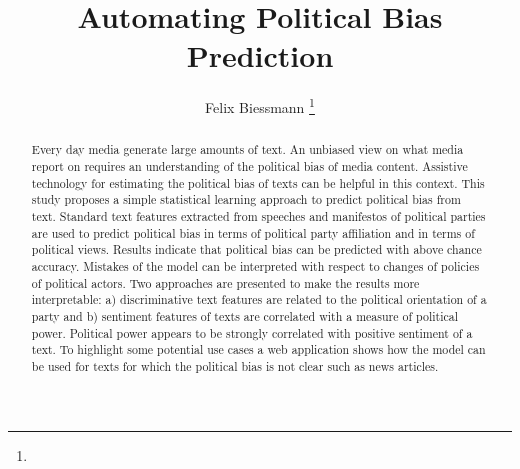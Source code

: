 \documentclass[runningheads,a4paper]{llncs}
\begin{document}
\mainmatter  %

\title{Automating Political Bias Prediction}


%
%
\author{
Felix Biessmann
\thanks{}
%
}


%
%

\tocauthor{}
\maketitle

\begin{abstract} 
Every day media generate large amounts of text. An unbiased view on what media report on requires an understanding of the political bias of media content. Assistive technology for estimating the political bias of texts can be helpful in this context. This study proposes a simple statistical learning approach to predict political bias from text. Standard text features extracted from speeches and manifestos of political parties are used to predict political bias in terms of political party affiliation and in terms of political views. Results indicate that political bias can be predicted with above chance accuracy. Mistakes of the model can be interpreted with respect to changes of policies of political actors. Two approaches are presented to make the results more interpretable: a) discriminative text features are related to the political orientation of a party and b) sentiment features of texts are correlated with a measure of political power. Political power appears to be strongly correlated with positive sentiment of a text. To highlight some potential use cases a web application shows how the model can be used for texts for which the political bias is not clear such as news articles.
\end{abstract} 
\end{document}

